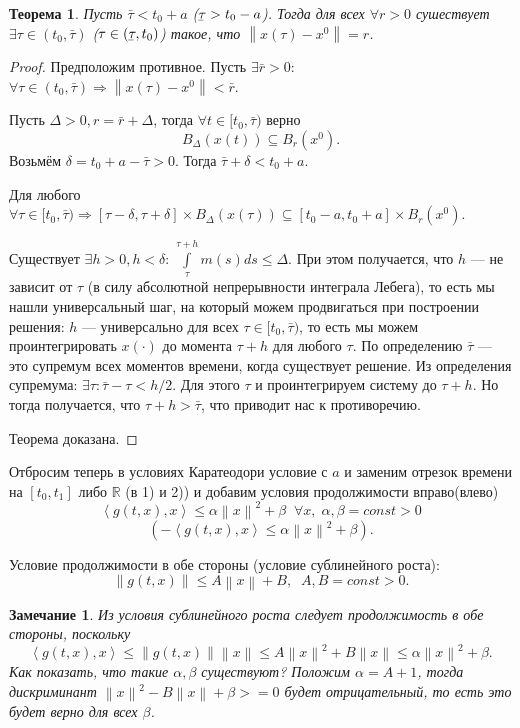 \documentclass[12pt, a4paper]{article}
\newcommand{\ubar}[1]{\underaccent{\bar}{#1}}
\theoremstyle{rusdef}
\newtheorem{theorem}{Теорема}
\newtheorem{remark}{Замечание}
\newcommand\scalar[1]{\left < #1 \right >} %
\newcommand{\R}{\ensuremath{\mathbb{R}}} %
\newcommand{\norm}[1]{\left\lVert #1 \right\rVert} %
\DeclareMathOperator*{\thus}{\Rightarrow} %
\begin{document}
\begin{theorem}
Пусть $\bar{\tau} < t_0 + a$ ($\ubar{\tau} > t_0 - a$). Тогда для всех $\forall r > 0$ сушествует $\exists \tau \in (t_0, \bar{\tau})$ ($\tau \in (\ubar{\tau}, t_0)$) такое, что $\norm{x(\tau) - x^0} = r$.
\end{theorem}
\begin{proof}
Предположим противное. Пусть $\exists \bar{r} >0$: $\forall \tau \in (t_0, \bar{\tau}) \thus \norm{x(\tau) - x^0} < \bar{r}$.

Пусть $\Delta > 0, r = \bar{r} + \Delta$, тогда $\forall t \in [t_0, \bar{\tau})$ верно
$$
B_{\Delta}(x(t)) \subseteq B_r(x^0).
$$
Возьмём $\delta = t_0 + a - \bar{\tau} > 0$. Тогда $\bar{\tau} + \delta < t_0 + a$.

Для любого $\forall \tau \in [t_0, \bar{\tau}) \thus [\tau - \delta, \tau + \delta] \times B_{\Delta}(x(\tau)) \subseteq [t_0 - a, t_0 + a] \times B_r(x^0)$. 

Существует $\exists h > 0, h < \delta$: $\int\limits_{\tau}^{\tau + h} m(s) ds \leqslant \Delta$. При этом получается, что $h$ --- не зависит от $\tau$ (в силу абсолютной непрерывности интеграла Лебега), то есть мы нашли универсальный шаг, на который можем продвигаться при построении решения: $h$ --- универсально для всех $\tau \in [t_0, \bar{\tau})$, то есть мы можем проинтегрировать $x(\cdot)$ до момента $\tau + h$ для любого $\tau$. По определению $\bar{\tau}$ --- это супремум всех моментов времени, когда существует решение. Из определения супремума: $\exists \tau \colon \bar{\tau} - \tau < h/2$. Для этого $\tau$ и проинтегрируем систему до $\tau + h$. Но тогда получается, что $\tau + h > \bar{\tau}$, что приводит нас к противоречию.

Теорема доказана.
\end{proof}

Отбросим теперь в условиях Каратеодори условие с $a$ и заменим отрезок времени на $[t_0, t_1]$ либо $\R$ (в 1) и 2)) и добавим условия продолжимости вправо(влево)
\begin{equation}
\scalar{g(t,x), x} \leqslant \alpha \norm{x}^2 + \beta \;\; \forall x, \; \alpha, \beta = const > 0
\end{equation}
$$
(-\scalar{g(t,x), x} \leqslant \alpha \norm{x}^2 + \beta).
$$

Условие продолжимости в обе стороны (условие сублинейного роста):
$$
\norm{g(t,x)} \leqslant A \norm{x} + B, \;\; A, B = const > 0.
$$

\begin{remark}
Из условия сублинейного роста следует продолжимость в обе стороны, поскольку
$$
\scalar{g(t,x), x} \leqslant \norm{g(t,x)} \norm{x} \leqslant A \norm{x}^2 + B \norm{x} \leqslant \alpha \norm{x}^2 + \beta.
$$
Как показать, что такие $\alpha, \beta$ существуют? Положим $\alpha = A + 1$, тогда дискриминант $\norm{x}^2 - B\norm{x} + \beta >= 0$ будет отрицательный, то есть это будет верно для всех $\beta$.
\end{remark}
\end{document}
